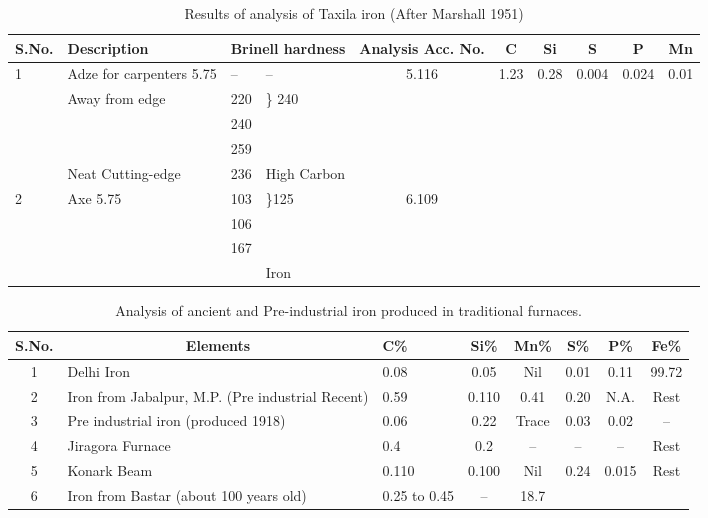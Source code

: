 {\setlength\tabcolsep{2pt}
{\fontsize{8}{10}\selectfont
\begin{longtable}{|l|p{2.5cm}|p{.5cm}|p{.5cm}|c|c|c|c|c|c|}
\caption{Results of analysis of Taxila iron (After Marshall 1951)}\label{table 8.1}\\
\hline
\textbf{S.No.} & \textbf{Description} & \multicolumn{2}{m{1.3cm}|}{\centering \textbf{Brinell  hardness}} & \multicolumn{1}{m{1.3cm}|}{\centering \textbf{Analysis Acc. No.}} & \textbf{C} & \textbf{Si} & \textbf{S} & \textbf{P} & \textbf{Mn}\\
\hline
1 & Adze for carpenters 5.75 & -- & -- & 5.116 & 1.23 & 0.28 & 0.004 & 0.024 & 0.01\\
  & Away from edge & 220  &\multirow{2}{1cm}{\} 240}&&&&&&\\
  &  & 240 &&&&&&&\\
  & & 259 &&&&&&&\\
  & Neat Cutting-edge & 236 & High Carbon &&&&&&\\
  \hline
  2 & Axe 5.75 & 103 & \multirow{3}{1cm}{\}125}& 6.109 &&&&&\\
  & & 106 &&&&&&&\\
  & & 167 &&&&&&&\\
  & & & Iron &&&&&&\\
  \hline
\end{longtable}
}}
\newpage

{\setlength\tabcolsep{2pt}
\begin{longtable}{|c|p{3cm}|p{1cm}|c|c|c|c|c|}
\caption{Analysis of ancient and Pre-industrial iron produced in traditional furnaces.}\label{table 8.2}\\
\hline
\textbf{S.No.} & \multicolumn{1}{c|}{\textbf{Elements}} & \textbf{C\%} & \textbf{Si\%} & \textbf{Mn\%} & \textbf{S\%} & \textbf{P\%} & \textbf{Fe\%} \\
\hline
1 & Delhi Iron & 0.08 & 0.05 & Nil & 0.01 & 0.11 & 99.72\\
2 & Iron from Jabalpur, M.P. (Pre industrial Recent) & 0.59 & 0.110 & 0.41 & 0.20 & N.A. & Rest\\
3 & Pre industrial iron (produced 1918) & 0.06 & 0.22 & Trace & 0.03 & 0.02 & --\\
4 & Jiragora Furnace & 0.4 & 0.2 & -- & -- & -- & Rest\\
5 & Konark Beam & 0.110 & 0.100 & Nil & 0.24 & 0.015 & Rest\\
6 & Iron from Bastar (about 100 years old) & 0.25 to 0.45 & -- & 18.7 & & & \\
\hline
\end{longtable}
}

